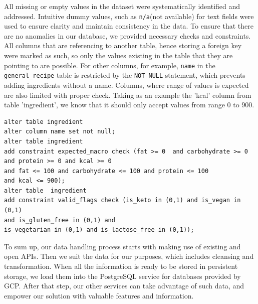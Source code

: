 All missing or empty values in the dataset were systematically identified and addressed. Intuitive dummy values, such as \texttt{n/a}(not available) for text fields were used to ensure clarity and maintain consistency in the data. To ensure that there are no anomalies in our database, we provided necessary checks and constraints. All columns that are referencing to another table, hence storing a foreign key were marked as such, so only the values existing in the table that they are pointing to are possible. For other columns, for example, \texttt{name} in the \texttt{general\_recipe} table is restricted by the \texttt{NOT NULL}  statement, which prevents adding ingredients without a name. Columns, where range of values is expected are also limited with proper check. Taking as an example the 'kcal' column from table 'ingredient', we know that it should only accept values from range 0 to 900.
{
\begin{verbatim}
alter table ingredient
alter column name set not null;
alter table ingredient
add constraint expected_macro check (fat >= 0  and carbohydrate >= 0 
and protein >= 0 and kcal >= 0
and fat <= 100 and carbohydrate <= 100 and protein <= 100
and kcal <= 900);
alter table  ingredient
add constraint valid_flags check (is_keto in (0,1) and is_vegan in (0,1)
and is_gluten_free in (0,1) and
is_vegetarian in (0,1) and is_lactose_free in (0,1));
\end{verbatim}
\label{fig:Contraints}
}
\par
To sum up, our data handling process starts with making use of existing and open APIs. Then we suit the data for our purposes, which includes cleansing and transformation. When all the information is ready to be stored in persistent storage, we load them into the PostgreSQL \cite{Postgres} service for databases provided by GCP. After that step, our other services can take advantage of such data, and empower our solution with valuable features and information.

